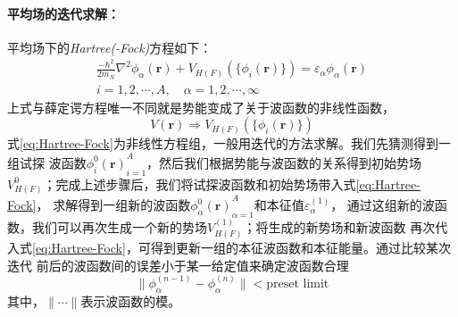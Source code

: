 \paragraph*{平均场的迭代求解：}
平均场下的\textsl{Hartree(-Fock)}方程如下：
\begin{equation}
    \begin{aligned}
        \frac{-\hbar^{2}}{2m_N} \nabla^{2} \phi_{\alpha}(\bm{r}) + V_{H(F)}\left(
        \{\phi_{i}(\bm{r})\}\right) = \varepsilon_{\alpha}\phi_{\alpha}(\bm{r}) \\ 
        i = 1, 2, \cdots, A, \quad \alpha = 1, 2, \cdots, \infty
    \end{aligned}
    \label{eq:Hartree-Fock}
\end{equation}
上式与薛定谔方程唯一不同就是势能变成了关于波函数的非线性函数，
\begin{equation*} V(\bm{r}) \Longrightarrow V_{H(F)}(\{\phi_{i}(\bm{r})\})
\end{equation*}
式\eqref{eq:Hartree-Fock}为非线性方程组，一般用迭代的方法求解。我们先猜测得到一组试探
波函数${\phi_i^0(\bm{r})}_{i=1}^{A}$，然后我们根据势能与波函数的关系得到初始势场
$V_{H(F)}^{0}$；完成上述步骤后，我们将试探波函数和初始势场带入式\eqref{eq:Hartree-Fock}，
求解得到一组新的波函数${\phi_{\alpha}^0(\bm{r})}_{\alpha=1}^{A}$和本征值$\varepsilon_{\alpha}^{(1)}$，
通过这组新的波函数，我们可以再次生成一个新的势场$V_{H(F)}^{(1)}$；将生成的新势场和新波函数
再次代入式\eqref{eq:Hartree-Fock}，可得到更新一组的本征波函数和本征能量。通过比较某次迭代
前后的波函数间的误差小于某一给定值来确定波函数合理
\begin{equation}
    \parallel \phi_{\alpha}^{(n-1)} - \phi_{\alpha}^{(n)} \parallel < \text{preset limit}
    \label{eq:iter-error}
\end{equation}
其中，$\parallel \cdots \parallel$表示波函数的模。

